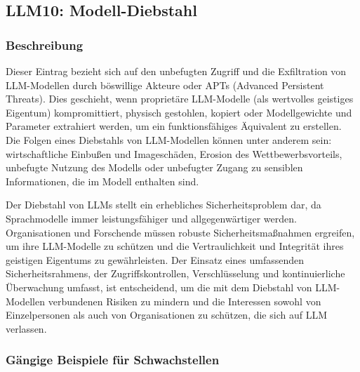 \documentclass[
]{article}
\author{}
\date{}
\begin{document}
\subsection{LLM10: Modell-Diebstahl}\label{llm10-modell-diebstahl}

\subsubsection{Beschreibung}\label{beschreibung}

Dieser Eintrag bezieht sich auf den unbefugten Zugriff und die
Exfiltration von LLM-Modellen durch böswillige Akteure oder APTs
(Advanced Persistent Threats). Dies geschieht, wenn proprietäre
LLM-Modelle (als wertvolles geistiges Eigentum) kompromittiert, physisch
gestohlen, kopiert oder Modellgewichte und Parameter extrahiert werden,
um ein funktionsfähiges Äquivalent zu erstellen. Die Folgen eines
Diebstahls von LLM-Modellen können unter anderem sein: wirtschaftliche
Einbußen und Imageschäden, Erosion des Wettbewerbsvorteils, unbefugte
Nutzung des Modells oder unbefugter Zugang zu sensiblen Informationen,
die im Modell enthalten sind.

Der Diebstahl von LLMs stellt ein erhebliches Sicherheitsproblem dar, da
Sprachmodelle immer leistungsfähiger und allgegenwärtiger werden.
Organisationen und Forschende müssen robuste Sicherheitsmaßnahmen
ergreifen, um ihre LLM-Modelle zu schützen und die Vertraulichkeit und
Integrität ihres geistigen Eigentums zu gewährleisten. Der Einsatz eines
umfassenden Sicherheitsrahmens, der Zugriffskontrollen, Verschlüsselung
und kontinuierliche Überwachung umfasst, ist entscheidend, um die mit
dem Diebstahl von LLM-Modellen verbundenen Risiken zu mindern und die
Interessen sowohl von Einzelpersonen als auch von Organisationen zu
schützen, die sich auf LLM verlassen.

\subsubsection{Gängige Beispiele für
Schwachstellen}\label{guxe4ngige-beispiele-fuxfcr-schwachstellen}
\end{document}
